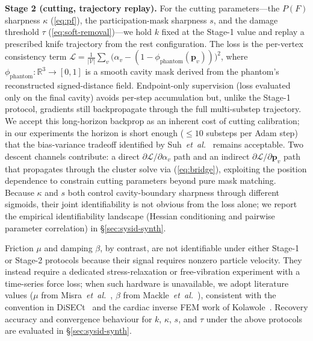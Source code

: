 \textbf{Stage 2 (cutting, trajectory replay).} For the cutting
parameters---the $P(F)$ sharpness $\kappa$ (\ref{eq:pf}), the
participation-mask sharpness $s$, and the damage threshold $\tau$
(\ref{eq:soft-removal})---we hold $k$ fixed at the Stage-1 value and
replay a prescribed knife trajectory from the rest configuration.
The loss is the per-vertex consistency term
$\mathcal{L} \!=\! \tfrac{1}{|\mathcal{V}|}\sum_v\big(\alpha_v -
(1 - \phi_{\text{phantom}}(\mathbf{p}_v))\big)^2$,
where $\phi_{\text{phantom}}: \mathbb{R}^3 \to [0,1]$ is a smooth
cavity mask derived from the phantom's reconstructed signed-distance
field. Endpoint-only supervision (loss evaluated only on the final
cavity) avoids per-step accumulation but, unlike the Stage-1
protocol, gradients still backpropagate through the full multi-substep
trajectory. We accept this long-horizon backprop as an inherent cost
of cutting calibration; in our experiments the horizon is short
enough ($\leq\!10$ substeps per Adam step) that the
bias-variance tradeoff identified by Suh~\textit{et~al.}~\cite{suh2022}
remains acceptable.
Two descent channels contribute: a direct
$\partial\mathcal{L}/\partial\alpha_v$ path and an indirect
$\partial\mathcal{L}/\partial\mathbf{p}_v$ path that propagates
through the cluster solve via (\ref{eq:bridge}), exploiting the
position dependence to constrain cutting parameters beyond pure mask
matching. Because $\kappa$ and $s$ both control cavity-boundary
sharpness through different sigmoids, their joint identifiability is
not obvious from the loss alone; we report the empirical
identifiability landscape (Hessian conditioning and pairwise
parameter correlation) in \S\ref{sec:sysid-synth}.

Friction $\mu$ and damping $\beta$, by contrast, are not identifiable
under either Stage-1 or Stage-2 protocols because their signal
requires nonzero particle velocity. They instead require a dedicated
stress-relaxation or free-vibration experiment with a time-series
force loss; when such hardware is unavailable, we adopt literature
values ($\mu$ from Misra~\textit{et~al.}~\cite{misra2010}, $\beta$
from Mackle~\textit{et~al.}~\cite{mackle2020}), consistent with the
convention in DiSECt~\cite{heiden2021disect} and the cardiac inverse
FEM work of Kolawole~\cite{kolawole2023}. Recovery accuracy and
convergence behaviour for $k$, $\kappa$, $s$, and $\tau$ under the
above protocols are evaluated in \S\ref{sec:sysid-synth}.

